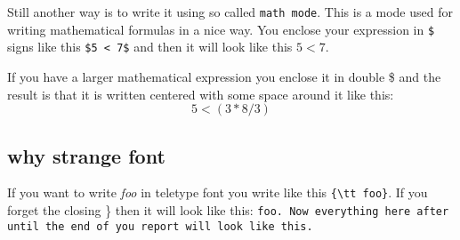\documentclass[a4paper,11pt]{article}
\begin{document}
Still another way is to write it using so called {\tt math mode}. This
is a mode used for writing mathematical formulas in a nice way. You
enclose your expression in {\tt \$} signs like this {\tt \$5 < 7\$}
and then it will look like this $5 < 7$.

If you have a larger mathematical expression you enclose it in double
\$ and the result is that it is written centered with some space
around it like this:  $$ 5 < (3 * 8 / 3 ) $$

\subsection*{why strange font}

If you want to write {\em foo} in teletype font you write like this
\verb+{\tt foo}+. If you forget the closing \} then it will look like
this: {\tt foo. Now everything here after until the end of you report
  will look like this. }
\end{document}
